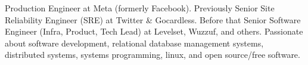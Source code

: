 

\begin{cvparagraph}

  Production Engineer at Meta (formerly Facebook). Previously Senior Site Reliability Engineer (SRE)
  at Twitter \& Gocardless. Before that Senior Software Engineer (Infra, Product, Tech Lead) at
  Levelset, Wuzzuf, and others. Passionate about software development, relational database
  management systems, distributed systems, systems programming, linux, and open source/free
  software.

\end{cvparagraph}
